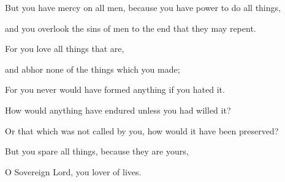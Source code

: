 {\par }{\Q {}But you have mercy on all men, because you have power to do all things,
\par }{\QB and you overlook the sins of men to the end that they may repent.
\par }{\Q {}For you love all things that are,
\par }{\QB and abhor none of the things which you made;
\par }{\QB For you never would have formed anything if you hated it.
\par }{\Q {}How would anything have endured unless you had willed it?
\par }{\QB Or that which was not called by you, how would it have been preserved?
\par }{\Q {}But you spare all things, because they are yours,
\par }{\QB O Sovereign Lord, you lover of lives.

}
